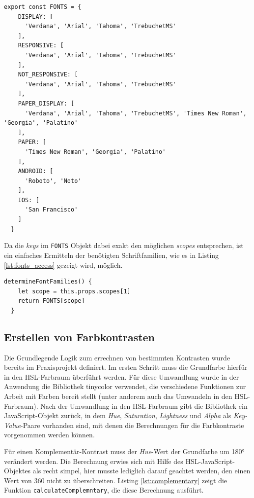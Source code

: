 \begin{lstlisting}[caption=Aufbau des \texttt{FONTS} Objektes, label=lst:fonts_object]
  export const FONTS = {
    DISPLAY: [
      'Verdana', 'Arial', 'Tahoma', 'TrebuchetMS'
    ],
    RESPONSIVE: [
      'Verdana', 'Arial', 'Tahoma', 'TrebuchetMS'
    ],
    NOT_RESPONSIVE: [
      'Verdana', 'Arial', 'Tahoma', 'TrebuchetMS'
    ],
    PAPER_DISPLAY: [
      'Verdana', 'Arial', 'Tahoma', 'TrebuchetMS', 'Times New Roman', 'Georgia', 'Palatino'
    ],
    PAPER: [
      'Times New Roman', 'Georgia', 'Palatino'
    ],
    ANDROID: [
      'Roboto', 'Noto'
    ],
    IOS: [
      'San Francisco'
    ]
  }
\end{lstlisting}

Da die \textit{keys} im \verb|FONTS| Objekt dabei exakt den möglichen \textit{scopes} entsprechen\footnotemark{}, ist ein einfaches Ermitteln der benötigten Schriftfamilien, wie es in Listing \ref{lst:fonts_access} gezeigt wird, möglich.


\begin{lstlisting}[caption=Zugriff auf Werte des \texttt{FONTS} Objektes, label=lst:fonts_access]
  determineFontFamilies() {
    let scope = this.props.scopes[1]
    return FONTS[scope]
  }
\end{lstlisting}

\subsection{Erstellen von Farbkontrasten}
Die Grundlegende Logik zum errechnen von bestimmten Kontrasten wurde bereits im Praxisprojekt definiert. Im ersten Schritt muss die Grundfarbe hierfür in den HSL-Farbraum überführt werden. Für diese Umwandlung wurde in der Anwendung die Bibliothek tinycolor\footnotemark{} verwendet, die verschiedene Funktionen zur Arbeit mit Farben bereit stellt (unter anderem auch das Umwandeln in den HSL-Farbraum).
Nach der Umwandlung in den HSL-Farbraum gibt die Bibliothek ein JavaScript-Objekt zurück, in dem \textit{Hue}, \textit{Saturation}, \textit{Lightness} und \textit{Alpha} als \textit{Key-Value}-Paare vorhanden sind, mit denen die Berechnungen für die Farbkontraste vorgenommen werden können.


Für einen Komplementär-Kontrast muss der \textit{Hue}-Wert der Grundfarbe um 180° verändert werden. Die Berechnung erwies sich mit Hilfe des HSL-JavaScript-Objektes als recht simpel, hier musste lediglich darauf geachtet werden, den einen Wert von 360 nicht zu überschreiten. Listing \ref{lst:complementary} zeigt die Funktion \verb|calculateComplemntary|, die diese Berechnung ausführt.

